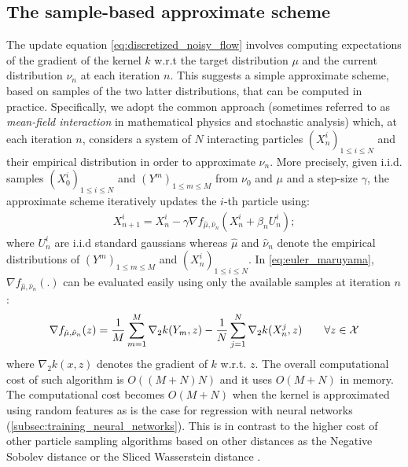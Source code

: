 
\subsection{The sample-based approximate scheme}\label{sec:sample_based}

The update equation \eqref{eq:discretized_noisy_flow} involves computing expectations of the gradient of the kernel $k$ w.r.t the target distribution $\mu$ and the current distribution $\nu_n$ at each iteration $n$. This suggests a simple approximate scheme, based on samples of the two latter distributions, that can be computed in practice. Specifically, we adopt the common approach (sometimes referred to as \textit{mean-field interaction} in mathematical physics and stochastic analysis) which, at each iteration $n$, considers a system of $N$ interacting particles $(X_n^i)_{1\leq i\leq N}$  and their empirical distribution in order to approximate $\nu_n$. 
More precisely, given i.i.d. samples $(X^i_0)_{1\leq i\leq N}$ and $(Y^{m})_{1\leq m\leq M}$ from $\nu_0$ and $\mu$ and a step-size $\gamma$, the approximate scheme iteratively updates the $i$-th particle using: 
\begin{align}\label{eq:euler_maruyama}
X_{n+1}^{i} = X_n^i -\gamma \nabla f_{\hat{\mu},\hat{\nu}_n}(X_n^i+\beta_n U_n^i);
\end{align}
where $U_{n}^{i}$ are i.i.d standard gaussians whereas $\hat{\mu}$ and $\hat{\nu}_n$ denote the empirical distributions of $(Y^{m})_{1\leq m\leq M}$ and $(X^i_n)_{1\leq i\leq N}$. In \cref{eq:euler_maruyama}, $\nabla f_{\hat{\mu},\hat{\nu}_n}(.)$ can be evaluated easily using only the available samples at iteration $n$:
\begin{align}
	 \nabla f_{\hat{\mu},\hat{\nu}_n}(z) = \frac{1}{M}\sum\limits_{m=1}^M \nabla_2 k(Y_m,z)-\frac{1}{N}\sum\limits_{j=1}^N \nabla_2 k(X_n^j,z) \qquad \forall z\in{{\mathcal X}}
\end{align}
where $\nabla_2 k(x,z)$ denotes the gradient of $k$ w.r.t. $z$. The overall computational cost of such algorithm is $O((M+N)N)$ and it uses $O(M+N)$ in memory. The computational cost becomes  $O(M+N)$ when the kernel is approximated using random features as is the case for regression with neural networks (\cref{subsec:training_neural_networks}). This is in contrast to the higher cost of other particle sampling algorithms based on other distances as the Negative Sobolev distance \cite{Mroueh:2019}  or the Sliced Wasserstein distance \cite{Simsekli:2018}.
